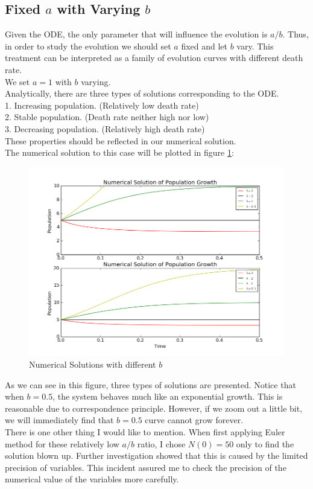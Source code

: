 \documentclass[10pt,a4paper]{article}
\begin{document}
   \subsection{Fixed $a$ with Varying $b$}
   Given the ODE, the only parameter that will influence the evolution is $a/b$. Thus, in order to study the evolution we should set $a$ fixed and let $b$ vary. This treatment can be interpreted as a family of evolution curves with different death rate.\\
   We set $a=1$ with $b$ varying.\\
   Analytically, there are three types of solutions corresponding to the ODE.\\
    1. Increasing population. (Relatively low death rate)\\
    2. Stable population. (Death rate neither high nor low)\\
    3. Decreasing population. (Relatively high death rate)\\
    These properties should be reflected in our numerical solution.\\ 
    The numerical solution to this case will be plotted in figure \ref{Figure_2}:
    \begin{figure}[htbp]
    	\centering
    	\includegraphics[width=5in]{Population_2.png}
    	\caption{Numerical Solutions with different $b$\label{Figure_2}}
    \end{figure}
    As we can see in this figure, three types of solutions are presented. Notice that when $b=0.5$, the system behaves much like an exponential growth. This is reasonable due to  correspondence principle. However, if we zoom out a little bit, we will immediately find that $b=0.5$ curve cannot grow forever.\\
    There is one other thing I would like to mention. When first applying Euler method for these relatively low $a/b$ ratio, I chose $N(0)=50$ only to find the solution blown up. Further investigation showed that this is caused by the limited precision of variables. This incident assured me to check the precision of the numerical value of the variables more carefully.
    
\end{document}
